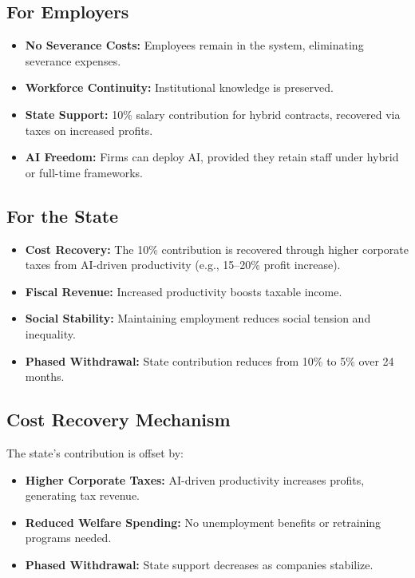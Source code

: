 \documentclass[12pt]{article}
\begin{document}
\subsection{For Employers}
\begin{itemize}
  \item \textbf{No Severance Costs:} Employees remain in the system, eliminating severance expenses.
  \item \textbf{Workforce Continuity:} Institutional knowledge is preserved.
  \item \textbf{State Support:} 10\% salary contribution for hybrid contracts, recovered via taxes on increased profits.
  \item \textbf{AI Freedom:} Firms can deploy AI, provided they retain staff under hybrid or full-time frameworks.
\end{itemize}

\subsection{For the State}
\begin{itemize}
  \item \textbf{Cost Recovery:} The 10\% contribution is recovered through higher corporate taxes from AI-driven productivity (e.g., 15--20\% profit increase).
  \item \textbf{Fiscal Revenue:} Increased productivity boosts taxable income.
  \item \textbf{Social Stability:} Maintaining employment reduces social tension and inequality.
  \item \textbf{Phased Withdrawal:} State contribution reduces from 10\% to 5\% over 24 months.
\end{itemize}

\subsection{Cost Recovery Mechanism}
The state's contribution is offset by:
\begin{itemize}
  \item \textbf{Higher Corporate Taxes:} AI-driven productivity increases profits, generating tax revenue.
  \item \textbf{Reduced Welfare Spending:} No unemployment benefits or retraining programs needed.
  \item \textbf{Phased Withdrawal:} State support decreases as companies stabilize.
\end{itemize}
\end{document}
